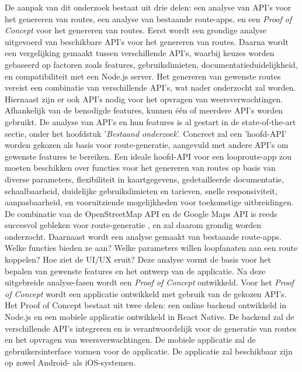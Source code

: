 De aanpak van dit onderzoek bestaat uit drie delen: een analyse van API's voor het genereren van routes, een analyse van bestaande route-apps, en een \emph{Proof of Concept} voor het genereren van routes.
Eerst wordt een grondige analyse uitgevoerd van beschikbare API's voor het genereren van routes.
Daarna wordt een vergelijking gemaakt tussen verschillende API's,
waarbij keuzes worden gebaseerd op factoren zoals features, gebruikslimieten,
documentatieduidelijkheid, en compatibiliteit met een Node.js server.
Het genereren van gewenste routes vereist een combinatie van verschillende API's,
wat nader onderzocht zal worden. Hiernaast zijn er ook API's nodig voor het opvragen van weersverwachtingen.
Afhankelijk van de benodigde features, kunnen één of meerdere API's worden gebruikt.
De analyse van API's en hun features is al gestart in de state-of-the-art sectie,
onder het hoofdstuk '\emph{Bestaand onderzoek}'.
Concreet zal een 'hoofd-API' worden gekozen als basis voor route-generatie,
aangevuld met andere API's om gewenste features te bereiken.
Een ideale hoofd-API voor een looproute-app zou moeten beschikken
over functies voor het genereren van routes op basis van diverse parameters, flexibiliteit in kaartgegevens,
gedetailleerde documentatie, schaalbaarheid, duidelijke gebruikslimieten en tarieven, snelle responsiviteit,
aanpasbaarheid, en vooruitziende mogelijkheden voor toekomstige uitbreidingen.
De combinatie van de OpenStreetMap API en de Google Maps API is reeds succesvol gebleken voor route-generatie \autocite{Loepp2018},
en zal daarom grondig worden onderzocht.
Daarnaast wordt een analyse gemaakt van bestaande route-apps.
Welke functies bieden ze aan? Welke parameters willen loopfanaten aan een route koppelen? Hoe ziet de UI/UX eruit?
Deze analyse vormt de basis voor het bepalen van gewenste features en het ontwerp van de applicatie.
Na deze uitgebreide analyse-fasen wordt een \emph{Proof of Concept} ontwikkeld.
Voor het \emph{Proof of Concept} wordt een applicatie ontwikkeld met gebruik van de gekozen API's.
Het Proof of Concept bestaat uit twee delen: een online backend ontwikkeld in Node.js
en een mobiele applicatie ontwikkeld in React Native. 
De backend zal de verschillende API's integreren en is verantwoordelijk voor 
de generatie van routes en het opvragen van weersverwachtingen.
De mobiele applicatie zal de gebruikersinterface vormen voor de applicatie.
De applicatie zal beschikbaar zijn op zowel Android- als iOS-systemen.

